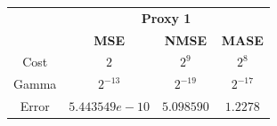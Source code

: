  \begin{center}
\begin{tabular}{|c|c|c|c|}
\hline
& \multicolumn{3}{|c|}{\textbf{Proxy 1}} \\ \cline{2-4}
& \textbf{MSE} & \textbf{NMSE} & \textbf{MASE}          \\ \hline
Cost  & $2$             &$2^9$      & $2^8$          \\ 
Gamma & $2^{-13}$       &$2^{-19}$  & $2^{-17}$ \\ 
Error & $5.443549e-10$  &$5.098590$ & $1.2278$     \\ 
\hline
\end{tabular}


 \begin{figure}[!h]
\centering
{}
\end{figure}
\end{center}

